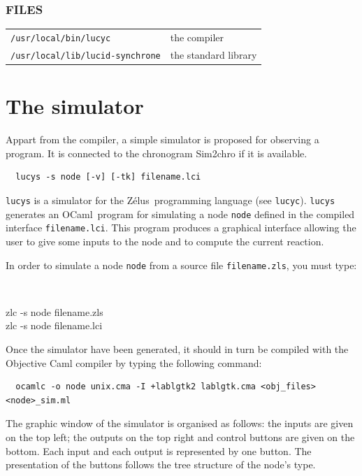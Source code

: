 \documentclass[11pt,titlepage,twoside]{report}
\newcommand{\zelus}{{\sf Z\'elus}}
\newcommand{\ocaml}{{\sf OCaml}}
\begin{document}
\subsection*{FILES}

\begin{tabular}{ll}
{\tt /usr/local/bin/lucyc}           & the compiler
\\
{\tt /usr/local/lib/lucid-synchrone} & the standard library
\end{tabular}

\chapter{The simulator}
Appart from the compiler, a simple simulator is proposed
for observing a program. It is connected to the chronogram Sim2chro if
it is available.

\begin{verbatim}
  lucys -s node [-v] [-tk] filename.lci
\end{verbatim}


\verb-lucys- is a simulator for the \zelus\ programming language (see
\verb-lucyc-). \verb-lucys- generates an \ocaml\ program for
simulating a node \verb-node- defined in the compiled interface
\verb-filename.lci-. This program produces a graphical interface
allowing the user to give some inputs to the node and to compute the
current reaction.


In order to simulate a node \verb-node- from a source file
\verb-filename.zls-, you must type:

{\tt
\begin{tabbing}
  zlc -s node filename.zls \\
  zlc -s node filename.lci
\end{tabbing}
}

Once the simulator have been generated, it should in turn be compiled
with the Objective Caml compiler by typing the following command:

\begin{verbatim}
  ocamlc -o node unix.cma -I +lablgtk2 lablgtk.cma <obj_files> <node>_sim.ml
\end{verbatim}


The graphic window of the simulator is organised as follows: the
inputs are given on the top left; the outputs on the top right and
control buttons are given on the bottom.
Each input and each output is represented
by one button. The presentation of the buttons follows the tree
structure of the node's type.
\end{document}
